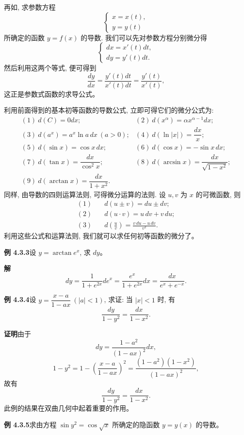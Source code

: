 \documentclass[UTF8, 12pt, fontset=fandol, oneside]{ctexart}
\begin{document}
再如, 求参数方程
\[
  \begin{cases}
    x=x(t),\\
    y=y(t)
  \end{cases}
\]
所确定的函数 $y=f(x)$ 的导数. 我们可以先对参数方程分别微分得
\[
  \begin{cases}
    dx=x'(t)dt,\\
    dy=y'(t)dt.
  \end{cases}
\]
然后利用这两个等式, 便可得到
\[
  \frac{dy}{dx}
  =
  \frac{y'(t)dt}{x'(t)dt}
  =
  \frac{y'(t)}{x'(t)},
\]
这正是参数式函数的求导公式。

利用前面得到的基本初等函数的导数公式, 立即可得它们的微分公式为:
\[
\begin{array}{ll}
  (1)\ d(C)=0dx; & (2)\ d(x^\alpha)=\alpha x^{\alpha-1}dx;\\[4pt]
  (3)\ d(a^x)=a^x\ln a\,dx\ (a>0); &
  (4)\ d(\ln|x|)=\dfrac{dx}{x};\\[8pt]
  (5)\ d(\sin x)=\cos x\,dx; &
  (6)\ d(\cos x)=-\sin x\,dx;\\[4pt]
  (7)\ d(\tan x)=\dfrac{dx}{\cos^2 x}; &
  (8)\ d(\arcsin x)=\dfrac{dx}{\sqrt{1-x^2}};\\[8pt]
  (9)\ d(\arctan x)=\dfrac{dx}{1+x^2}. &
\end{array}
\]
同样, 由导数的四则运算法则, 可得微分运算的法则. 设 $u,v$ 为 $x$ 的可微函数, 则
\[
\begin{aligned}
  (1)\quad &d(u\pm v)=du\pm dv;\\
  (2)\quad &d(u\cdot v)=u\,dv+v\,du;\\
  (3)\quad &d\left(\frac{u}{v}\right)=\frac{v\,du-u\,dv}{v^2}.
\end{aligned}
\]
利用这些公式和运算法则, 我们就可以求任何初等函数的微分了。

\noindent\textbf{例 4.3.3}\quad 设 $y=\arctan e^x$, 求 $dy$。

\noindent\textbf{解}\quad
\[
  dy
  =
  \frac{1}{1+e^{2x}}de^x
  =
  \frac{e^x}{1+e^{2x}}dx
  =
  \frac{dx}{e^x+e^{-x}}.
\]

\noindent\textbf{例 4.3.4}\quad 设 $y=\dfrac{x-a}{1-ax}\ (|a|<1)$, 求证: 当 $|x|<1$ 时, 有
\[
  \frac{dy}{1-y^2}=\frac{dx}{1-x^2}.
\]

\noindent\textbf{证明}\quad 由于
\[
  dy=\frac{1-a^2}{(1-ax)^2}dx,
\]
\[
  1-y^2
  =
  1-\left(\frac{x-a}{1-ax}\right)^2
  =
  \frac{(1-a^2)(1-x^2)}{(1-ax)^2},
\]
故有
\[
  \frac{dy}{1-y^2}=\frac{dx}{1-x^2}.
\]
此例的结果在双曲几何中起着重要的作用。

\noindent\textbf{例 4.3.5}\quad 求由方程 $\sin y^2=\cos\sqrt{x}$ 所确定的隐函数 $y=y(x)$ 的导数。
\end{document}
